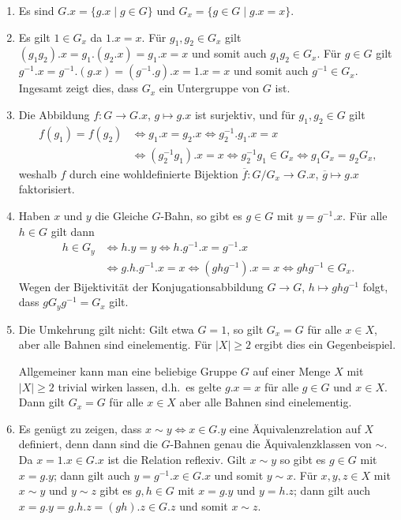 \begin{solution}
  \begin{enumerate}
    \item
      Es sind $G.x = \{g.x \mid g \in G\}$ und $G_x = \{g \in G \mid g.x = x\}$.
    \item
      Es gilt $1 \in G_x$ da $1.x = x$.
      Für $g_1, g_2 \in G_x$ gilt $(g_1 g_2).x = g_1.(g_2.x) = g_1.x = x$ und somit auch $g_1 g_2 \in G_x$.
      Für $g \in G$ gilt $g^{-1}.x = g^{-1}.(g.x) = (g^{-1}.g).x = 1.x = x$ und somit auch $g^{-1} \in G_x$.
      Ingesamt zeigt dies, dass $G_x$ ein Untergruppe von $G$ ist.
    \item
      Die Abbildung $f \colon G \to G.x$, $g \mapsto g.x$ ist surjektiv, und für $g_1, g_2 \in G$ gilt
      \begin{align*}
              f(g_1) = f(g_2)
        &\iff g_1.x = g_2.x
        \iff  g_2^{-1}.g_1.x = x
        \\
        &\iff (g_2^{-1} g_1).x = x
        \iff  g_2^{-1} g_1 \in G_x
        \iff  g_1 G_x = g_2 G_x,
      \end{align*}
      weshalb $f$ durch eine wohldefinierte Bijektion $\overline{f} \colon G/G_x \to G.x$, $\overline{g} \mapsto g.x$ faktorisiert.
    \item
      Haben $x$ und $y$ die Gleiche $G$-Bahn, so gibt es $g \in G$ mit $y = g^{-1}.x$.
      Für alle $h \in G$ gilt dann
      \begin{align*}
              h \in G_y
        &\iff h.y = y
        \iff  h.g^{-1}.x = g^{-1}.x
        \\
        &\iff g.h.g^{-1}.x = x
        \iff  (g h g^{-1}).x = x
        \iff  g h g^{-1} \in G_x.
      \end{align*}
      Wegen der Bijektivität der Konjugationsabbildung $G \to G$, $h \mapsto ghg^{-1}$ folgt, dass $g G_y g^{-1} = G_x$ gilt.
    \item
      Die Umkehrung gilt nicht:
      Gilt etwa $G = 1$, so gilt $G_x = G$ für alle $x \in X$, aber alle Bahnen sind einelementig.
      Für $|X| \geq 2$ ergibt dies ein Gegenbeispiel.
      
      Allgemeiner kann man eine beliebige Gruppe $G$ auf einer Menge $X$ mit $|X| \geq 2$ trivial wirken lassen, d.h.\ es gelte $g.x = x$ für alle $g \in G$ und $x \in X$.
      Dann gilt $G_x = G$ für alle $x \in X$ aber alle Bahnen sind einelementig.
    \item
      Es genügt zu zeigen, dass $x \sim y \iff x \in G.y$ eine Äquivalenzrelation auf $X$ definiert, denn dann sind die $G$-Bahnen genau die Äquivalenzklassen von ${\sim}$.
      Da $x = 1.x \in G.x$ ist die Relation reflexiv.
      Gilt $x \sim y$ so gibt es $g \in G$ mit $x = g.y$;
      dann gilt auch $y = g^{-1}.x \in G.x$ und somit $y \sim x$.
      Für $x, y, z \in X$ mit $x \sim y$ und $y \sim z$ gibt es $g, h \in G$ mit $x = g.y$ und $y = h.z$;
      dann gilt auch $x = g.y = g.h.z = (gh).z \in G.z$ und somit $x \sim z$.
  \end{enumerate}
\end{solution}


